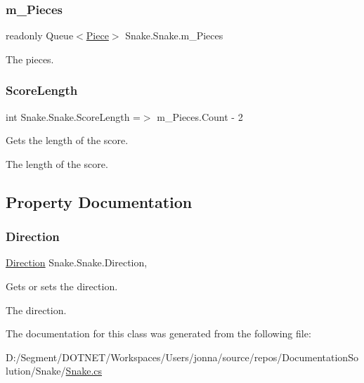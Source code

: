 \subsubsection{\texorpdfstring{m\+\_\+\+Pieces}{m\_Pieces}}
{\footnotesize\ttfamily readonly Queue$<$\mbox{\hyperlink{class_snake_1_1_piece}{Piece}}$>$ Snake.\+Snake.\+m\+\_\+\+Pieces\hspace{0.3cm}{\ttfamily [private]}}



The pieces. 

\mbox{\label{class_snake_1_1_snake_a912fc4449dc3eca0da55238e89ff36aa}} 
\subsubsection{\texorpdfstring{Score\+Length}{ScoreLength}}
{\footnotesize\ttfamily int Snake.\+Snake.\+Score\+Length =$>$ m\+\_\+\+Pieces.\+Count -\/ 2}



Gets the length of the score. 

The length of the score. 

\subsection{Property Documentation}
\mbox{\label{class_snake_1_1_snake_a31479cba3049a1e8371170df81c4eb23}} 
\subsubsection{\texorpdfstring{Direction}{Direction}}
{\footnotesize\ttfamily \mbox{\hyperlink{namespace_snake_a17196bbf1b4636022495ef12635a68f7}{Direction}} Snake.\+Snake.\+Direction\hspace{0.3cm}{\ttfamily [get]}, {\ttfamily [set]}}



Gets or sets the direction. 

The direction. 

The documentation for this class was generated from the following file\+:\begin{DoxyCompactItemize}
\item 
D\+:/\+Segment/\+D\+O\+T\+N\+E\+T/\+Workspaces/\+Users/jonna/source/repos/\+Documentation\+Solution/\+Snake/\mbox{\hyperlink{_snake_8cs}{Snake.\+cs}}\end{DoxyCompactItemize}
